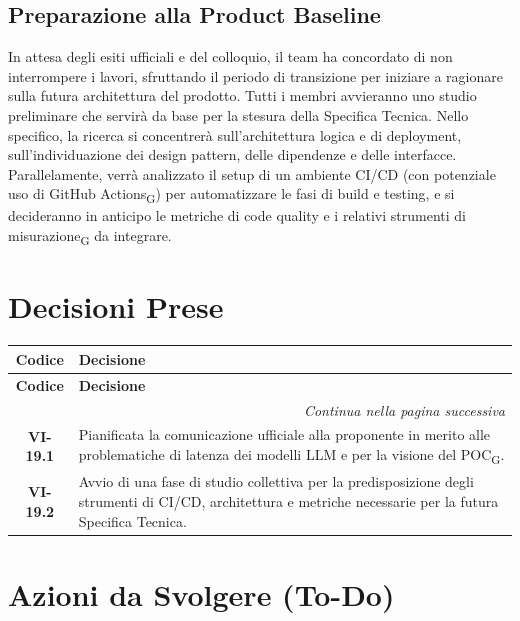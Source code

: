 \subsection{Preparazione alla Product Baseline}
In attesa degli esiti ufficiali e del colloquio, il team ha concordato di non interrompere i lavori, sfruttando il periodo di transizione per iniziare a ragionare sulla futura architettura del prodotto. Tutti i membri avvieranno uno studio preliminare che servirà da base per la stesura della Specifica Tecnica. Nello specifico, la ricerca si concentrerà sull'architettura logica e di deployment, sull'individuazione dei design pattern, delle dipendenze e delle interfacce. Parallelamente, verrà analizzato il setup di un ambiente CI/CD (con potenziale uso di GitHub Actions\textsubscript{G}) per automatizzare le fasi di build e testing, e si decideranno in anticipo le metriche di code quality e i relativi strumenti di misurazione\textsubscript{G} da integrare.

\section{Decisioni Prese}

\renewcommand{\arraystretch}{1.3}
\vspace{-0.3cm}
\noindent
\begin{longtable}{c p{12cm}}
    \toprule
    \textbf{Codice} & \textbf{Decisione} \\
    \midrule
    \endfirsthead

    \toprule
    \textbf{Codice} & \textbf{Decisione} \\
    \midrule
    \endhead

    \midrule
    \multicolumn{2}{r}{\textit{Continua nella pagina successiva}} \\
    \midrule
    \endfoot

    \bottomrule
    \endlastfoot

    \textbf{VI-19.1} & {Pianificata la comunicazione ufficiale alla proponente in merito alle problematiche di latenza dei modelli LLM e per la visione del POC\textsubscript{G}.} \\
	\textbf{VI-19.2} & {Avvio di una fase di studio collettiva per la predisposizione degli strumenti di CI/CD, architettura e metriche necessarie per la futura Specifica Tecnica.}
\end{longtable}

\section{Azioni da Svolgere (To-Do)}

